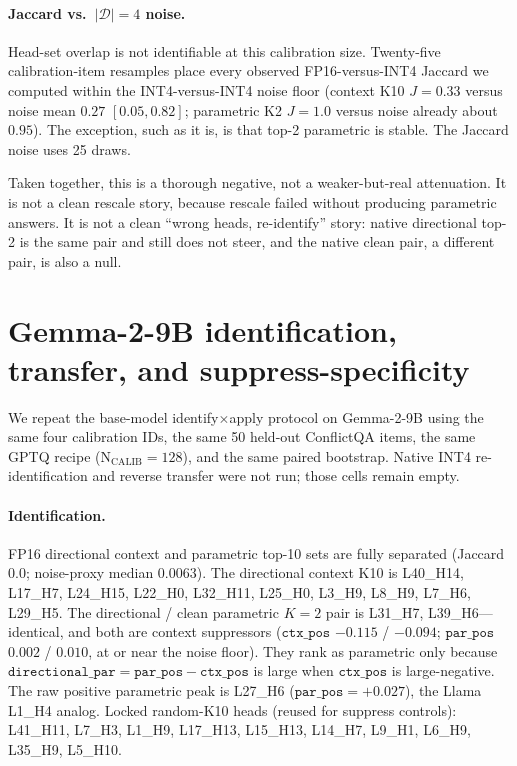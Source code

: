 \documentclass{article} %
\begin{document}
\paragraph{Jaccard vs.\ $|\mathcal{D}|{=}4$ noise.}
Head-set overlap is not identifiable at this calibration size. Twenty-five calibration-item resamples place every observed FP16-versus-INT4 Jaccard we computed within the INT4-versus-INT4 noise floor (context K10 $J{=}0.33$ versus noise mean $0.27$ $[0.05, 0.82]$; parametric K2 $J{=}1.0$ versus noise already about $0.95$). The exception, such as it is, is that top-2 parametric is stable. The Jaccard noise uses 25 draws.

Taken together, this is a thorough negative, not a weaker-but-real attenuation. It is not a clean rescale story, because rescale failed without producing parametric answers. It is not a clean ``wrong heads, re-identify'' story: native directional top-2 is the same pair and still does not steer, and the native clean pair, a different pair, is also a null.

\section{Gemma-2-9B identification, transfer, and suppress-specificity}
\label{app:gemma}

We repeat the base-model identify$\times$apply protocol on Gemma-2-9B using the same four calibration IDs, the same 50 held-out ConflictQA items, the same GPTQ recipe ($\mathrm{N_{CALIB}{=}128}$), and the same paired bootstrap. Native INT4 re-identification and reverse transfer were not run; those cells remain empty.

\paragraph{Identification.}
FP16 directional context and parametric top-10 sets are fully separated (Jaccard $0.0$; noise-proxy median $0.0063$). The directional context K10 is L40\_H14, L17\_H7, L24\_H15, L22\_H0, L32\_H11, L25\_H0, L3\_H9, L8\_H9, L7\_H6, L29\_H5. The directional / clean parametric $K{=}2$ pair is L31\_H7, L39\_H6---identical, and both are context suppressors ($\texttt{ctx\_pos}$ $-0.115$ / $-0.094$; $\texttt{par\_pos}$ $0.002$ / $0.010$, at or near the noise floor). They rank as parametric only because $\texttt{directional\_par} = \texttt{par\_pos} - \texttt{ctx\_pos}$ is large when $\texttt{ctx\_pos}$ is large-negative. The raw positive parametric peak is L27\_H6 ($\texttt{par\_pos}{=}+0.027$), the Llama L1\_H4 analog. Locked random-K10 heads (reused for suppress controls): L41\_H11, L7\_H3, L1\_H9, L17\_H13, L15\_H13, L14\_H7, L9\_H1, L6\_H9, L35\_H9, L5\_H10.
\end{document}
